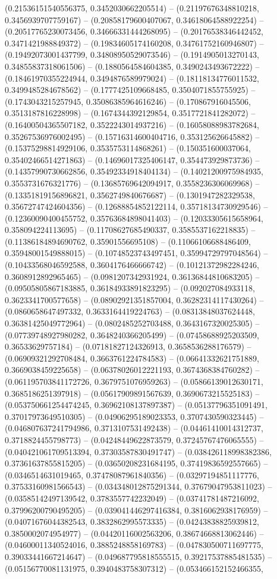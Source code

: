(0.21536151540556375, 0.3452030662205514) -- (0.21197676348810218, 0.3456939707759167) -- (0.20858179600407067, 0.34618064588922254) -- (0.20517765230073456, 0.34666331444268095) -- (0.20176538346442452, 0.3471421988849372) -- (0.19834605174160208, 0.34761752160946807) -- (0.19492073001437799, 0.34808950529073546) -- (0.1914905013270143, 0.34855837318061506) -- (0.1880564584604385, 0.3490243493672222) -- (0.18461970355224944, 0.3494876589979024) -- (0.18118134776011532, 0.3499485284678562) -- (0.1777425109668485, 0.3504071855755925) -- (0.1743043215257945, 0.35086385964616246) -- (0.170867916045506, 0.3513187816228998) -- (0.1674344392129854, 0.3517721841282072) -- (0.16400504365507182, 0.3522243014937216) -- (0.16058088983782684, 0.35267536976002495) -- (0.15716314600404716, 0.353125626645882) -- (0.15375298814929106, 0.3535753114868261) -- (0.150351600037064, 0.35402466514271863) -- (0.14696017325406147, 0.354473929873736) -- (0.14357990730662856, 0.35492334918404134) -- (0.14021200975984935, 0.3553731676321776) -- (0.13685769642094917, 0.3558236306069968) -- (0.13351819156896821, 0.3562749840676687) -- (0.1301947282329538, 0.35672747424604356) -- (0.12688854852122114, 0.35718134730929546) -- (0.12360090400455752, 0.35763684898041403) -- (0.12033305615658964, 0.358094224113695) -- (0.11708627685490337, 0.3585537162218835) -- (0.11386184894690762, 0.35901556695108) -- (0.11066106688486409, 0.35948001549888015) -- (0.10748523743497451, 0.35994729797048564) -- (0.10433568046592588, 0.3604176466666742) -- (0.10121372982284246, 0.3608912892965465) -- (0.0981207342931924, 0.36136844810683205) -- (0.09505805867183885, 0.36184933891823295) -- (0.092027084933118, 0.3623341700577658) -- (0.08902921351857004, 0.36282314117430264) -- (0.0860658647497332, 0.3633164419224763) -- (0.08313848037624448, 0.36381425049772964) -- (0.0802485252703488, 0.3643167320025305) -- (0.07739748927980282, 0.3648240366205499) -- (0.07458688925203509, 0.36533629757184) -- (0.07181827124326913, 0.3658536288176579) -- (0.06909321292708484, 0.3663761224784583) -- (0.06641332621751889, 0.3669038459225658) -- (0.06378026012221193, 0.3674368384760282) -- (0.061195703841172726, 0.3679751076959263) -- (0.05866139012630171, 0.3685186251397918) -- (0.05617909891567639, 0.3690673215525183) -- (0.053750661254474245, 0.36962108137897387) -- (0.05137796351091491, 0.37017973649510305) -- (0.04906295189023353, 0.3707430590323445) -- (0.046807637241794986, 0.3713107531492438) -- (0.04461410014312737, 0.3718824455798773) -- (0.04248449622873579, 0.37245767476065555) -- (0.040421061709513394, 0.37303587830491747) -- (0.038426118998382386, 0.37361637855815205) -- (0.03650208231684195, 0.37419836592557665) -- (0.0346514631019465, 0.37478087961840356) -- (0.03297194851117776, 0.37533160981566543) -- (0.034348012875291344, 0.37679047953811023) -- (0.03585142497139542, 0.3783557742232049) -- (0.03741781487216092, 0.37996200790495205) -- (0.039041446297416384, 0.3816062938176959) -- (0.04071676044382543, 0.3832862995573335) -- (0.04243838825939812, 0.3850002074954977) -- (0.04420116002563206, 0.38674668813062446) -- (0.04600011340524016, 0.3885248858169783) -- (0.047830500711697775, 0.39033441667214647) -- (0.049687795818555515, 0.39217537885481535) -- (0.05156770081131975, 0.3940483758307312) -- (0.053466152152466355, 